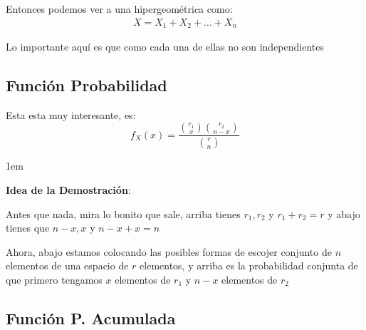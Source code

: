 \documentclass[12pt, fleqn]{report}                             %
\newenvironment{SmallIndentation}[1][0.75em]                    %
        {\begin{adjustwidth}{#1}{}\begin{footnotesize}}             %
        {\end{footnotesize}\end{adjustwidth}}                       %
\theoremstyle{break}                                            %
\begin{document}
                    Entonces podemos ver a una hipergeométrica como:
                    \begin{align*}
                        X = X_1 + X_2 + \dots + X_n
                    \end{align*}

                    Lo importante aquí es que como cada una de ellas no son independientes


            \clearpage
            \subsection{Función Probabilidad}

                Esta esta muy interesante, es:
                \begin{equation*}
                    f_X(x) = \dfrac{\binom{r_1}{x}\binom{r_2}{n - x}}{{r \choose n}}
                \end{equation*}

                \begin{SmallIndentation}[1em]
                    \textbf{Idea de la Demostración}:
                    
                    Antes que nada, mira lo bonito que sale, arriba tienes $r_1, r_2$ y $r_1+r_2=r$
                    y abajo tienes que $n-x, x$ y $n-x+x = n$
                    
                    Ahora, abajo estamos colocando las posibles formas de escojer conjunto de $n$
                    elementos de una espacio de $r$ elementos, y arriba es la probabilidad
                    conjunta de que primero tengamos $x$ elementos de $r_1$ y $n-x$ elementos de $r_2$
                
                \end{SmallIndentation}
                    

            \vspace{1em}
            \subsection{Función P. Acumulada}
\end{document}
